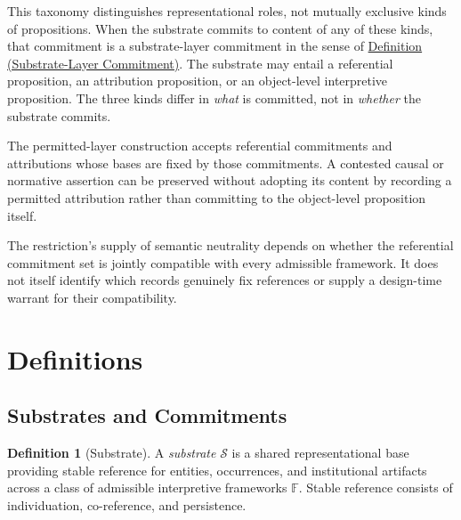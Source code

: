 \documentclass[11pt]{article}
\theoremstyle{plain}
\theoremstyle{definition}
\newtheorem{definition}[theorem]{Definition}
\theoremstyle{remark}
\newcommand{\DefRef}[2]{\hyperref[#1]{Definition (#2)}}
\newcommand{\Substrate}{\mathcal{S}}
\newcommand{\Frameworks}{\mathbb{F}}
\begin{document}
This taxonomy distinguishes representational roles,
not mutually exclusive kinds of propositions.
When the substrate commits to content of any of these kinds,
that commitment is a substrate-layer commitment in the sense of
\DefRef{se100.def.SubstrateCommitment}{Substrate-Layer Commitment}.
The substrate may entail a referential proposition,
an attribution proposition,
or an object-level interpretive proposition.
The three kinds differ in \emph{what} is committed,
not in \emph{whether} the substrate commits.

The permitted-layer construction accepts referential commitments and
attributions whose bases are fixed by those commitments.
A contested causal or normative assertion can be preserved without adopting
its content by recording a permitted attribution rather than committing
to the object-level proposition itself.

The restriction's supply of semantic neutrality depends on whether the referential
commitment set is jointly compatible with every admissible framework.
It does not itself identify which records genuinely fix references
or supply a design-time warrant for their compatibility.

\section{Definitions}
\label{sec:definitions}

\subsection*{Substrates and Commitments}

\begin{definition}[Substrate]
  \label{se100.def.Substrate}
  A \emph{substrate} $\Substrate$ is a shared representational base providing
  stable reference for entities, occurrences, and institutional artifacts
  across a class of admissible interpretive frameworks $\Frameworks$.
  Stable reference consists of individuation, co-reference, and persistence.
\end{definition}
\end{document}
